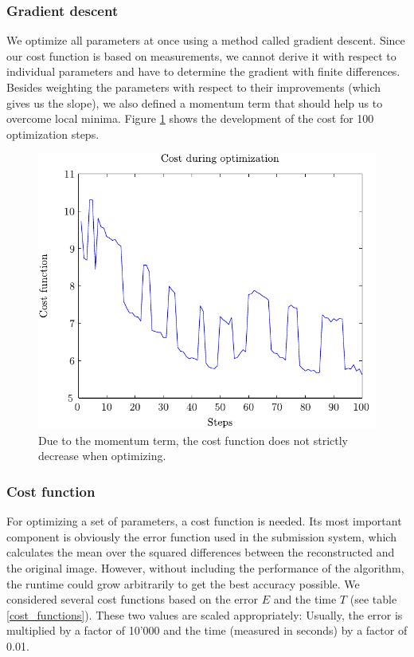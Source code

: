 \documentclass[10pt,conference,compsocconf]{IEEEtran}
\begin{document}
\subsubsection{Gradient descent}
\label{gradient_descent}
We optimize all parameters at once using a method called gradient descent. Since our cost function is based on measurements, we cannot derive it with respect to individual parameters and have to determine the gradient with finite differences. Besides weighting the parameters with respect to their improvements (which gives us the slope), we also defined a momentum term that should help us to overcome local minima. Figure \ref{gradient_descent_cost} shows the development of the cost for 100 optimization steps.

\begin{figure}
\centering
\includegraphics[width=0.7\columnwidth]{../plots/cost_plot.pdf}
\caption{Due to the momentum term, the cost function does not strictly decrease when optimizing.}
\label{gradient_descent_cost}
\end{figure}

\subsubsection{Cost function}
For optimizing a set of parameters, a cost function is needed. Its most important component is obviously the error function used in the submission system, which calculates the mean over the squared differences between the reconstructed and the original image. However, without including the performance of the algorithm, the runtime could grow arbitrarily to get the best accuracy possible. We considered several cost functions based on the error $E$ and the time $T$ (see table \ref{cost_functions}). These two values are scaled appropriately: Usually, the error is multiplied by a factor of 10'000 and the time (measured in seconds) by a factor of 0.01.
\end{document}
